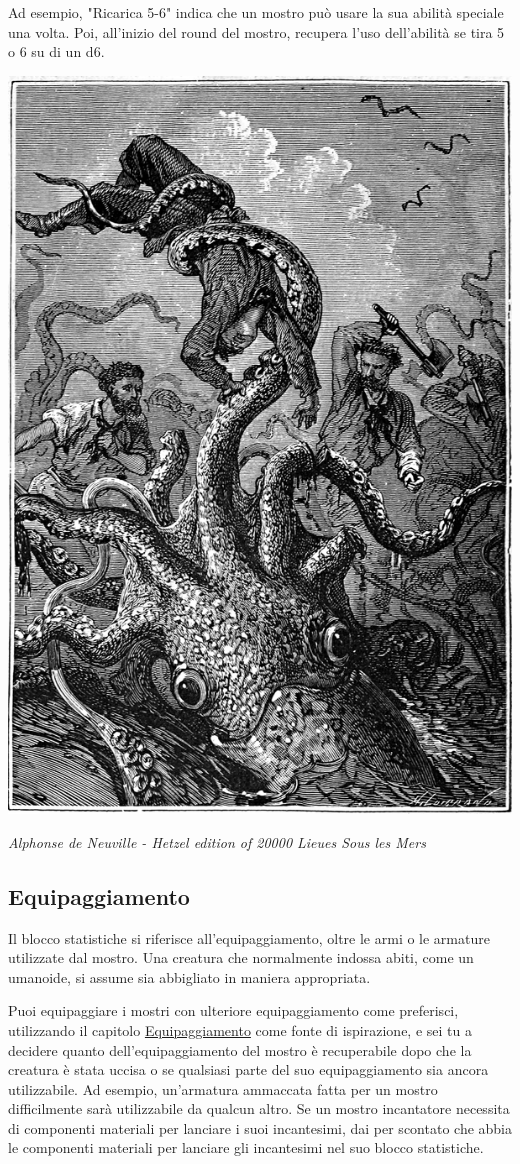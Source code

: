 \begin{multicols}{2}
Ad esempio, "Ricarica 5-6" indica che un mostro può usare la sua abilità speciale una volta. Poi, all'inizio del round del mostro, recupera l'uso dell'abilità se tira 5 o 6 su di un d6.

\begin{center}
\includegraphics[width=0.55\linewidth]{immagini/polpo.png}

\textit{Alphonse de Neuville - Hetzel edition of 20000 Lieues Sous les Mers}
\end{center}


\subsection{Equipaggiamento}

Il blocco statistiche si riferisce all'equipaggiamento, oltre le armi o le armature utilizzate dal mostro. Una creatura che normalmente indossa abiti, come un umanoide, si assume sia abbigliato in maniera appropriata.

Puoi equipaggiare i mostri con ulteriore equipaggiamento come preferisci, utilizzando il capitolo \hyperlink{equipaggiamento}{Equipaggiamento} come fonte di ispirazione, e sei tu a decidere quanto dell'equipaggiamento del mostro è recuperabile dopo che la creatura è stata uccisa o se qualsiasi parte del suo equipaggiamento sia ancora utilizzabile. Ad esempio, un'armatura ammaccata fatta per un mostro difficilmente sarà utilizzabile da qualcun altro. Se un mostro incantatore necessita di componenti materiali per lanciare i suoi incantesimi, dai per scontato che abbia le componenti materiali per lanciare gli incantesimi nel suo blocco statistiche.


\end{multicols}
